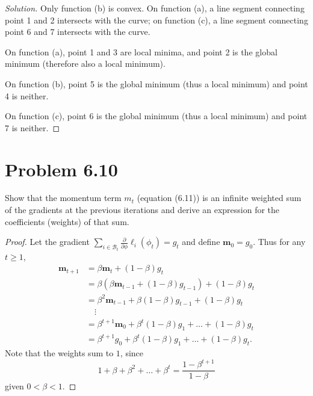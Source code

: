 \documentclass[10pt]{article}
\begin{document}
\begin{proof}[Solution]
    Only function (b) is convex. On function (a), a line segment connecting point 1 and 2 intersects with the curve; on function (c), a line segment connecting point 6 and 7 intersects with the curve. 

    On function (a), point 1 and 3 are local minima, and point 2 is the global minimum (therefore also a local minimum). 

    On function (b), point 5 is the global minimum (thus a local minimum) and point 4 is neither. 

    On function (c), point 6 is the global minimum (thus a local minimum) and point 7 is neither. 
\end{proof}

\vspace{5em}

\section*{Problem 6.10}
Show that the momentum term \( m_t \) (equation (6.11)) is an infinite weighted sum of the gradients at the previous iterations and derive an expression for the coefficients (weights) of that sum. 

\begin{proof}
    Let the gradient \(\displaystyle \sum_{i \in \mathcal{B}_t}{\frac{\partial}{\partial \phi} \ell_i(\phi_t)} = g_t\) and define \(\mathbf{m}_0 = g_0\). Thus for any \(t \geq 1\), 
    \begin{align*}
        \mathbf{m}_{t+1} &= \beta \mathbf{m}_t + (1-\beta)g_t \\
        &= \beta(\beta \mathbf{m}_{t-1} + (1-\beta)g_{t-1}) + (1-\beta)g_t \\
        &= \beta^2 \mathbf{m}_{t-1} + \beta(1-\beta)g_{t-1} + (1-\beta)g_t \\
        &\quad\vdots \\
        &= \beta^{t+1}{\mathbf{m}_0} + \beta^t(1-\beta)g_1 + \dots + (1-\beta)g_t \\
        &= \beta^{t+1}{g_0} + \beta^t(1-\beta)g_1 + \dots + (1-\beta)g_t. 
    \end{align*}
    Note that the weights sum to \(1\), since 
    \begin{equation*}
        1 + \beta + \beta^2 + \dots + \beta^t = \frac{1 - \beta^{t+1}}{1-\beta}
    \end{equation*}
    given \(0<\beta<1\). 
\end{proof}
\end{document}
